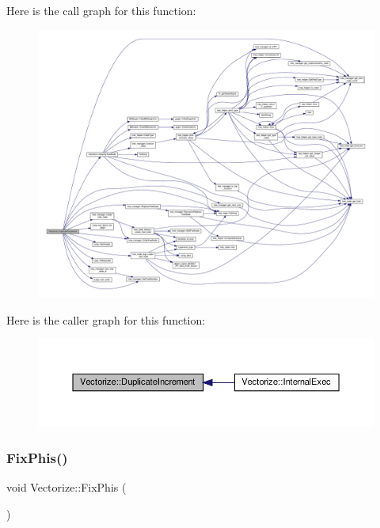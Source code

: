 Here is the call graph for this function\+:
\nopagebreak
\begin{figure}[H]
\begin{center}
\leavevmode
\includegraphics[width=350pt]{d5/da5/classVectorize_ae0735ec00e07e40a9bc81fce55521bfc_cgraph}
\end{center}
\end{figure}
Here is the caller graph for this function\+:
\nopagebreak
\begin{figure}[H]
\begin{center}
\leavevmode
\includegraphics[width=350pt]{d5/da5/classVectorize_ae0735ec00e07e40a9bc81fce55521bfc_icgraph}
\end{center}
\end{figure}
\mbox{\label{classVectorize_ad00739ff3efe2a9d5b2676fbc2a461be}} 
\subsubsection{\texorpdfstring{Fix\+Phis()}{FixPhis()}}
{\footnotesize\ttfamily void Vectorize\+::\+Fix\+Phis (\begin{DoxyParamCaption}{ }\end{DoxyParamCaption})\hspace{0.3cm}{\ttfamily [private]}}



